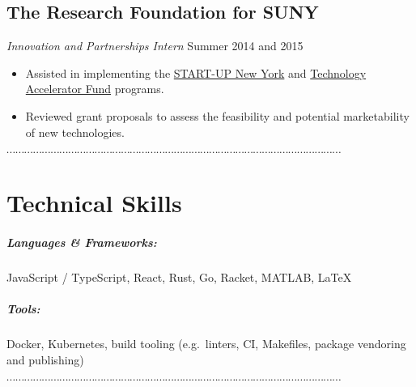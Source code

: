 \documentclass[10pt]{article}
\newcommand{\dotfringe}{
    \begin{center}
      $\cdots\cdots\cdots\cdots\cdots\cdots\cdots\cdots\cdots\cdots\cdots\cdots\cdots\cdots\cdots\cdots\cdots\cdots\cdots\cdots\cdots\cdots\cdots\cdots\cdots\cdots\cdots\cdots\cdots\cdots\cdots\cdots\cdots\cdots\cdots\cdots\cdots\cdots$
    \end{center}
}
\begin{document}
\subsection*{The Research Foundation for SUNY}
\textit{Innovation and Partnerships Intern} \hfill Summer 2014 and 2015
\begin{itemize}
  \item Assisted in implementing the \href{https://esd.ny.gov/startup-ny-program}{START-UP New York} and \href{https://www.rfsuny.org/Our-Work/Innovation-and-Partnerships/Programs/Technology-Accelerator-Fund/}{Technology Accelerator Fund} programs.
  \item Reviewed grant proposals to assess the feasibility and potential marketability of new technologies.
\end{itemize}
\dotfringe{}
\section*{Technical Skills}
  \subparagraph{Languages \& Frameworks:} JavaScript / TypeScript, React, Rust,
  Go, Racket, MATLAB, \LaTeX\@
  \subparagraph{Tools:} Docker, Kubernetes, build tooling (e.g.\ linters, CI,
  Makefiles, package vendoring and publishing)

\dotfringe{}
\end{document}
